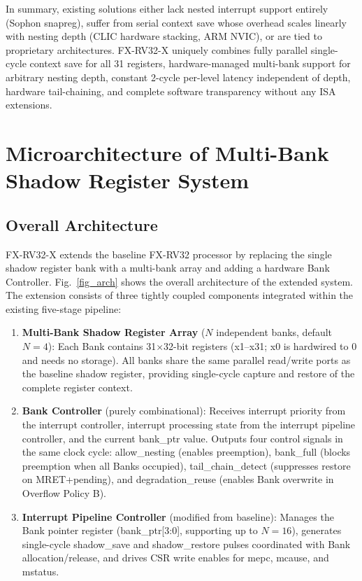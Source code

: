 \documentclass[letterpaper,journal]{IEEEtran}
\begin{document}
In summary, existing solutions either lack nested interrupt support entirely (Sophon snapreg), suffer from serial context save whose overhead scales linearly with nesting depth (CLIC hardware stacking, ARM NVIC), or are tied to proprietary architectures.
FX-RV32-X uniquely combines fully parallel single-cycle context save for all 31 registers, hardware-managed multi-bank support for arbitrary nesting depth, constant 2-cycle per-level latency independent of depth, hardware tail-chaining, and complete software transparency without any ISA extensions.

\section{Microarchitecture of Multi-Bank Shadow Register System}

\subsection{Overall Architecture}

FX-RV32-X extends the baseline FX-RV32 processor by replacing the single shadow register bank with a multi-bank array and adding a hardware Bank Controller.
Fig.~\ref{fig_arch} shows the overall architecture of the extended system.
The extension consists of three tightly coupled components integrated within the existing five-stage pipeline:

\begin{enumerate}
\item \textbf{Multi-Bank Shadow Register Array} ($N$ independent banks, default $N=4$): Each Bank contains 31$\times$32-bit registers (x1--x31; x0 is hardwired to 0 and needs no storage). All banks share the same parallel read/write ports as the baseline shadow register, providing single-cycle capture and restore of the complete register context.

\item \textbf{Bank Controller} (purely combinational): Receives interrupt priority from the interrupt controller, interrupt processing state from the interrupt pipeline controller, and the current bank\_ptr value. Outputs four control signals in the same clock cycle: allow\_nesting (enables preemption), bank\_full (blocks preemption when all Banks occupied), tail\_chain\_detect (suppresses restore on MRET+pending), and degradation\_reuse (enables Bank overwrite in Overflow Policy B).

\item \textbf{Interrupt Pipeline Controller} (modified from baseline): Manages the Bank pointer register (bank\_ptr[3:0], supporting up to $N=16$), generates single-cycle shadow\_save and shadow\_restore pulses coordinated with Bank allocation/release, and drives CSR write enables for mepc, mcause, and mstatus.
\end{enumerate}
\end{document}
